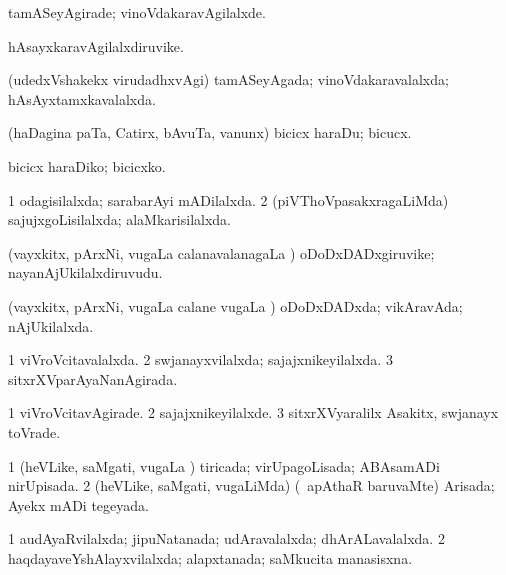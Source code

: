 \bentry
{} 
\gl{\kirxvi}
\expl{}
\bmng
 tamASeyAgirade; vinoVdakaravAgilalxde. 
\emng
\eentry

\bentry
{} 
\gl{\nA}
\expl{}
\bmng
 hAsayxkaravAgilalxdiruvike. 
\emng
\eentry

\bentry
{} 
\gl{\gu}
\expl{}
\bmng
 (udedxVshakekx virudadhxvAgi) tamASeyAgada; vinoVdakaravalalxda; hAsAyxtamxkavalalxda. 
\emng
\eentry

\bentry
{} 
\gl{\sakirx}
\expl{}
\bmng
 (haDagina paTa, Catirx, bAvuTa, \mo vanunx) bicicx haraDu; bicucx. 
\emng

\noindent
\gl{\akirx} 
\bmng
bicicx haraDiko; bicicxko. 
\emng
\eentry

\bentry
{} 
\gl{\gu}
\expl{}
\bmng
\bnum
\num{1} odagisilalxda; sarabarAyi mADilalxda. 
\num{2} (piVThoVpasakxragaLiMda) sajujxgoLisilalxda; alaMkarisilalxda. 
\enum
\emng
\eentry

\bentry
{} 
\gl{\nA}
\expl{}
\bmng
 (vayxkitx, pArxNi, \mo vugaLa calanavalanagaLa \vi) oDoDxDADxgiruvike; nayanAjUkilalxdiruvudu. 
\emng
\eentry

\bentry
{} 
\gl{\gu}
\expl{}
\bmng
 (vayxkitx, pArxNi, \mo vugaLa calane \mo vugaLa \vi) oDoDxDADxda; vikAravAda; nAjUkilalxda. 
\emng
\eentry

\bentry
{} 
\gl{\gu}
\expl{}
\bmng
\bnum
\num{1} viVroVcitavalalxda. 
\num{2} swjanayxvilalxda; sajajxnikeyilalxda. 
\num{3} sitxrXVparAyaNanAgirada. 
\enum
\emng
\eentry

\bentry
{} 
\gl{\kirxvi}
\expl{}
\bmng
\bnum
\num{1} viVroVcitavAgirade. 
\num{2} sajajxnikeyilalxde. 
\num{3} sitxrXVyaralilx Asakitx, swjanayx toVrade. 
\enum
\emng
\eentry

\bentry
{} 
\gl{\gu}
\expl{}
\bmng
\bnum
\num{1} (heVLike, saMgati, \mo vugaLa \vi) tiricada; virUpagoLisada; ABAsamADi nirUpisada. 
\num{2} (heVLike, saMgati, \mo vugaLiMda) (\kanmu\ apAthaR baruvaMte) Arisada; Ayekx mADi tegeyada. 
\enum
\emng
\eentry

\bentry
{} 
\gl{\gu}
\expl{}
\bmng
\bnum
\num{1} audAyaRvilalxda; jipuNatanada; udAravalalxda; dhArALavalalxda. 
\num{2} haqdayaveYshAlayxvilalxda; alapxtanada; saMkucita manasisxna. 
\enum
\emng
\eentry

